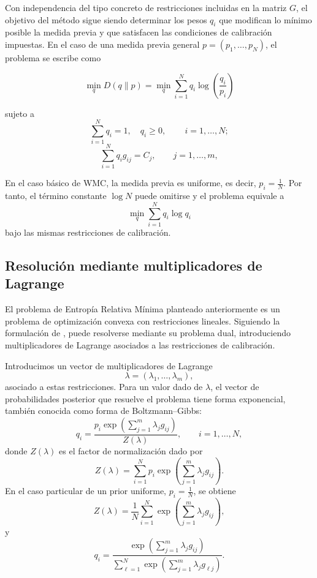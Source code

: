 Con independencia del tipo concreto de restricciones incluidas en la matriz \(G\), el objetivo del método sigue siendo determinar los pesos \(q_i\) que modifican lo mínimo posible la medida previa y que satisfacen las condiciones de calibración impuestas. En el caso de una medida previa general \(p=(p_1,\ldots,p_N)\), el problema se escribe como

\begin{equation}
\label{eq:problema_minimizacion_wmc}
   \min_q D(q\|p) = \min_{q}
    \sum_{i=1}^N q_i
    \log\left(\frac{q_i}{p_i}\right)
\end{equation}

sujeto a
\[
\sum_{i=1}^N q_i=1,\quad q_i\geq 0,\,
\qquad i=1,\ldots,N;
\]
\[
\sum_{i=1}^N q_i g_{ij}=C_j,
\qquad j=1,\ldots,m,
\]

En el caso básico de WMC, la medida previa es uniforme, es decir, \(\displaystyle p_i=\frac{1}{N}\). Por tanto, el término constante \(\log N\) puede omitirse y el problema equivale a 
\[
 \min_q\sum_{i=1}^N q_i\log q_i
\]
bajo las mismas restricciones de calibración.

\subsection*{Resolución mediante multiplicadores de Lagrange}

El problema de Entropía Relativa Mínima planteado anteriormente es un problema de optimización convexa con restricciones lineales. Siguiendo la formulación de \cite{articleAvellaneda}, puede resolverse mediante su problema dual, introduciendo multiplicadores de Lagrange asociados a las restricciones de calibración.\medskip

Introducimos un vector de multiplicadores de Lagrange
\[
\lambda=(\lambda_1,\ldots,\lambda_m),
\]
asociado a estas restricciones. Para un valor dado de \(\lambda\), el vector de probabilidades posterior que resuelve el problema tiene forma exponencial, también conocida como forma de Boltzmann--Gibbs:
\begin{equation*}
\displaystyle
    q_i
=
\frac{
p_i\exp\left(\sum_{j=1}^m \lambda_j g_{ij}\right)
}{
Z(\lambda)
},
\qquad i=1,\ldots,N,
\end{equation*}
donde \(Z(\lambda)\) es el factor de normalización dado por
\[
Z(\lambda)
=
\sum_{i=1}^N
p_i
\exp\left(\sum_{j=1}^m \lambda_j g_{ij}\right).
\]
En el caso particular de un prior uniforme, \(\displaystyle p_i=\frac{1}{N}\), se obtiene
\[
Z(\lambda)
=
\frac{1}{N}
\sum_{i=1}^N
\exp\left(\sum_{j=1}^m \lambda_j g_{ij}\right),
\]
y
\[
q_i
=
\frac{
\exp\left(\sum_{j=1}^m \lambda_j g_{ij}\right)
}{
\sum_{\ell=1}^N
\exp\left(\sum_{j=1}^m \lambda_j g_{\ell j}\right)
}.
\]

